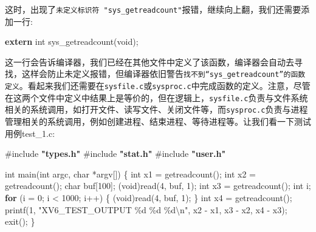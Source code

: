 \documentclass[
]{article}
\newenvironment{Shaded}{}{}
\newcommand{\ControlFlowTok}[1]{\textcolor[rgb]{0.00,0.44,0.13}{\textbf{#1}}}
\newcommand{\DataTypeTok}[1]{\textcolor[rgb]{0.56,0.13,0.00}{#1}}
\newcommand{\DecValTok}[1]{\textcolor[rgb]{0.25,0.63,0.44}{#1}}
\newcommand{\ImportTok}[1]{\textcolor[rgb]{0.00,0.50,0.00}{\textbf{#1}}}
\newcommand{\KeywordTok}[1]{\textcolor[rgb]{0.00,0.44,0.13}{\textbf{#1}}}
\newcommand{\NormalTok}[1]{#1}
\newcommand{\OperatorTok}[1]{\textcolor[rgb]{0.40,0.40,0.40}{#1}}
\newcommand{\PreprocessorTok}[1]{\textcolor[rgb]{0.74,0.48,0.00}{#1}}
\newcommand{\SpecialCharTok}[1]{\textcolor[rgb]{0.25,0.44,0.63}{#1}}
\newcommand{\StringTok}[1]{\textcolor[rgb]{0.25,0.44,0.63}{#1}}
\begin{document}
这时，出现了\texttt{未定义标识符\ "sys\_getreadcount"}报错，继续向上翻，我们还需要添加一行:

\begin{Shaded}
  \begin{Highlighting}[]
    \KeywordTok{extern} \DataTypeTok{int}\NormalTok{ sys\_getreadcount}\OperatorTok{(}\DataTypeTok{void}\OperatorTok{);}
  \end{Highlighting}
\end{Shaded}

这一行会告诉编译器，我们已经在其他文件中定义了该函数，编译器会自动去寻找，这样会防止未定义报错，但编译器依旧警告\texttt{找不到“sys\_getreadcount”的函数定义}。看起来我们还需要在\texttt{sysfile.c}或\texttt{sysproc.c}中完成函数的定义。注意，尽管在这两个文件中定义中结果上是等价的，但在逻辑上，\texttt{sysfile.c}负责与文件系统相关的系统调用，如打开文件、读写文件、关闭文件等，而\texttt{sysproc.c}负责与进程管理相关的系统调用，例如创建进程、结束进程、等待进程等。让我们看一下测试用例test\_1.c:

\begin{Shaded}
  \begin{Highlighting}[]
    \PreprocessorTok{\#include }\ImportTok{"types.h"}
    \PreprocessorTok{\#include }\ImportTok{"stat.h"}
    \PreprocessorTok{\#include }\ImportTok{"user.h"}

    \DataTypeTok{int}\NormalTok{ main}\OperatorTok{(}\DataTypeTok{int}\NormalTok{ argc}\OperatorTok{,} \DataTypeTok{char} \OperatorTok{*}\NormalTok{argv}\OperatorTok{[])}
    \OperatorTok{\{}
    \DataTypeTok{int}\NormalTok{ x1 }\OperatorTok{=}\NormalTok{ getreadcount}\OperatorTok{();}
    \DataTypeTok{int}\NormalTok{ x2 }\OperatorTok{=}\NormalTok{ getreadcount}\OperatorTok{();}
    \DataTypeTok{char}\NormalTok{ buf}\OperatorTok{[}\DecValTok{100}\OperatorTok{];}
    \OperatorTok{(}\DataTypeTok{void}\OperatorTok{)}\NormalTok{read}\OperatorTok{(}\DecValTok{4}\OperatorTok{,}\NormalTok{ buf}\OperatorTok{,} \DecValTok{1}\OperatorTok{);}
    \DataTypeTok{int}\NormalTok{ x3 }\OperatorTok{=}\NormalTok{ getreadcount}\OperatorTok{();}
    \DataTypeTok{int}\NormalTok{ i}\OperatorTok{;}
    \ControlFlowTok{for} \OperatorTok{(}\NormalTok{i }\OperatorTok{=} \DecValTok{0}\OperatorTok{;}\NormalTok{ i }\OperatorTok{\textless{}} \DecValTok{1000}\OperatorTok{;}\NormalTok{ i}\OperatorTok{++)}
    \OperatorTok{\{}
    \OperatorTok{(}\DataTypeTok{void}\OperatorTok{)}\NormalTok{read}\OperatorTok{(}\DecValTok{4}\OperatorTok{,}\NormalTok{ buf}\OperatorTok{,} \DecValTok{1}\OperatorTok{);}
    \OperatorTok{\}}
    \DataTypeTok{int}\NormalTok{ x4 }\OperatorTok{=}\NormalTok{ getreadcount}\OperatorTok{();}
    \NormalTok{  printf}\OperatorTok{(}\DecValTok{1}\OperatorTok{,} \StringTok{"XV6\_TEST\_OUTPUT }\SpecialCharTok{\%d}\StringTok{ }\SpecialCharTok{\%d}\StringTok{ }\SpecialCharTok{\%d\textbackslash{}n}\StringTok{"}\OperatorTok{,}\NormalTok{ x2 }\OperatorTok{{-}}\NormalTok{ x1}\OperatorTok{,}\NormalTok{ x3 }\OperatorTok{{-}}\NormalTok{ x2}\OperatorTok{,}\NormalTok{ x4 }\OperatorTok{{-}}\NormalTok{ x3}\OperatorTok{);}
    \NormalTok{  exit}\OperatorTok{();}
    \OperatorTok{\}}
  \end{Highlighting}
\end{Shaded}
\end{document}
